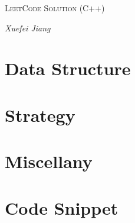 \documentclass [a4paper,UTF8, oneside]{book}
\begin{document}
\begin{titlepage}
\begin{center}
\vspace*{\fill} %
{\scshape\LARGE LeetCode Solution (C++) \par}
\vspace{2cm}
{\Large\itshape Xuefei Jiang \par}
\vspace*{\fill} %
\end{center}
\end{titlepage}

\tableofcontents
{}
\setcounter{tocdepth}{3}

\part{Data Structure}









\part{Strategy}





\part{Miscellany}






\part{Code Snippet}






%
\end{document}

